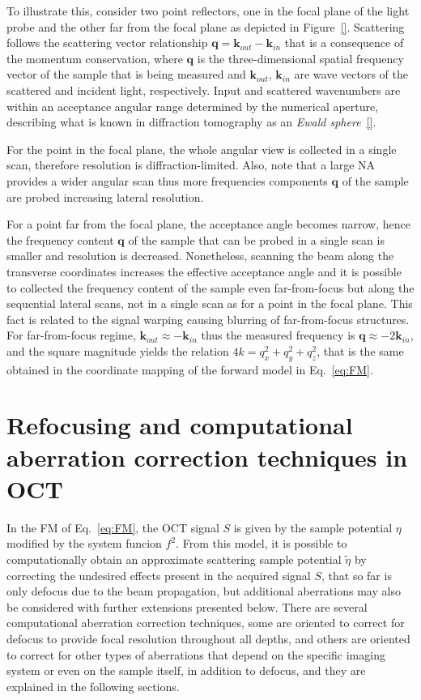 To illustrate this, consider two point reflectors, one in the focal plane of the light probe and the other far from the focal plane as depicted in  Figure~\ref{}. Scattering follows the scattering vector relationship $\mathbf{q} = \mathbf{k}_{out} - \mathbf{k}_{in}$ that is a consequence of the momentum conservation, where $\mathbf{q}$ is the three-dimensional spatial frequency vector of the sample that is being measured and $\mathbf{k}_{out}$, $\mathbf{k}_{in}$ are wave vectors of the scattered and incident light, respectively. Input and scattered wavenumbers are within an acceptance angular range determined by the numerical aperture, describing what is known in diffraction tomography as an \textit{Ewald sphere}~\ref{}.

For the point in the focal plane, the whole angular view is collected in a single scan, therefore resolution is diffraction-limited. Also, note that a large NA provides a wider angular scan thus more frequencies components $\mathbf{q}$ of the sample are probed increasing lateral resolution.

For a point far from the focal plane, the acceptance angle becomes narrow, hence the frequency content $\mathbf{q}$ of the sample that can be probed in a single scan is smaller and resolution is decreased. Nonetheless, scanning the beam along the transverse coordinates increases the effective acceptance angle and it is possible to collected the frequency content of the sample even far-from-focus but along the sequential lateral scans, not in a single scan as for a point in the focal plane. This fact is related to the signal warping causing blurring of far-from-focus structures. For far-from-focus regime, $\mathbf{k}_{out}\approx - \mathbf{k}_{in}$ thus the measured frequency is $\mathbf{q} \approx -2 \mathbf{k}_{in}$, and the square magnitude yields the relation $4k = q_x^2 + q_y^2 + q_z^2$, that is the same obtained in the coordinate mapping of the forward model in Eq.~\ref{eq:FM}.
\fi


\section{Refocusing and computational aberration correction techniques in OCT}\label{CAC}

In the FM of Eq.~\ref{eq:FM}, the OCT signal $S$ is given by the sample potential $\eta$ modified by the system funcion $f^2$. From this model, it is possible to computationally obtain an approximate scattering sample potential $\tilde{\eta}$ by correcting the undesired effects present in the acquired signal $S$, that so far is only defocus due to the beam propagation, but additional aberrations may also be considered with further extensions presented below. There are several computational aberration correction techniques, some are oriented to correct for defocus to provide focal resolution throughout all depths, and others are oriented to correct for other types of aberrations that depend on the specific imaging system or even on the sample itself, in addition to defocus, and they are explained in the following sections.

